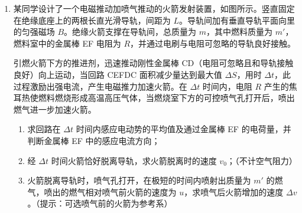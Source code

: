 \documentclass[\gkver]{gaokaozhenti}
\begin{document}
\begin{enumerate}
{	

	（3）画出离子的运动轨迹，如图所示。离子通过区域 Ⅰ 时，速度的偏转角为 $\theta$，由几何关系得 $\tan\theta=\frac{v_{y}}{v}$，由运动学公式得 $v_{y}=at$，$a=\frac{qE}{m}$，$t=\frac{L}{v}$，$v'=\sqrt{v^{2}+v_{y}^{2}}$，离子通过区域 Ⅱ 时，轨迹圆圆心角为 $2\theta$，由几何关系得 $R'\sin\theta=\frac{L}{2}$，由洛伦兹力提供向心力得 $qv'B=m\frac{v'^{2}}{R}$，联立解得 $B=\frac{2E}{v}$。

}

\item
某同学设计了一个电磁推动加喷气推动的火箭发射装置，如图所示。竖直固定在绝缘底座上的两根长直光滑导轨，间距为 $L$。导轨间加有垂直导轨平面向里的匀强磁场 $B$。绝缘火箭支撑在导轨间，总质量为 $m$，其中燃料质量为 $m'$，燃料室中的金属棒 EF 电阻为 $R$，并通过电刷与电阻可忽略的导轨良好接触。

引燃火箭下方的推进剂，迅速推动刚性金属棒 CD（电阻可忽略且和导轨接触良好）向上运动，当回路 CEFDC 面积减少量达到最大值 $\Delta S$，用时 $\Delta t$，此过程激励出强电流，产生电磁推力加速火箭。在 $\Delta t$ 时间内，电阻 $R$ 产生的焦耳热使燃料燃烧形成高温高压气体，当燃烧室下方的可控喷气孔打开后，喷出燃气进一步加速火箭。
\begin{enumerate}
	\item
	求回路在 $\Delta t$ 时间内感应电动势的平均值及通过金属棒 EF 的电荷量，并判断金属棒 EF 中的感应电流方向；
	\item
	经 $\Delta t$ 时间火箭恰好脱离导轨，求火箭脱离时的速度 $v_{0}$；（不计空气阻力）
	\item
	火箭脱离导轨时，喷气孔打开，在极短的时间内喷射出质量为 $m'$ 的燃气，喷出的燃气相对喷气前火箭的速度为 $u$，求喷气后火箭增加的速度 $\Delta v$。（提示：可选喷气前的火箭为参考系）
\end{enumerate}

\onepicture[align=right, h=8.51cm]{}

\end{enumerate}
\end{document}
